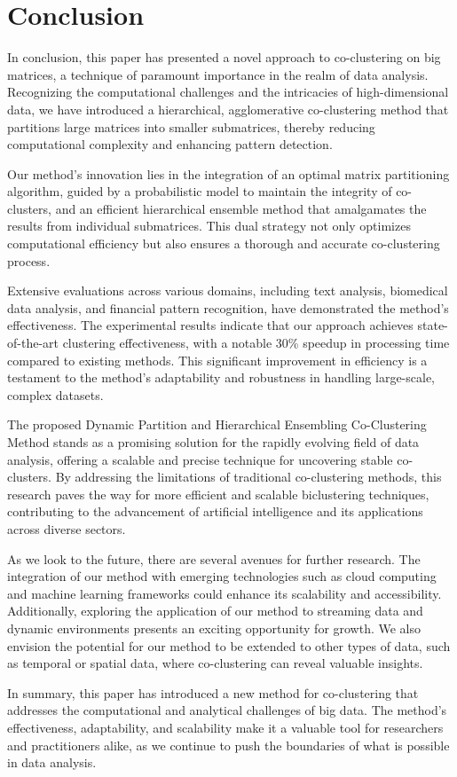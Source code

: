 
\section{Conclusion}
\label{sec:conclude}

In conclusion, this paper has presented a novel approach to co-clustering on big matrices, a technique of paramount importance in the realm of data analysis. Recognizing the computational challenges and the intricacies of high-dimensional data, we have introduced a hierarchical, agglomerative co-clustering method that partitions large matrices into smaller submatrices, thereby reducing computational complexity and enhancing pattern detection.

Our method's innovation lies in the integration of an optimal matrix partitioning algorithm, guided by a probabilistic model to maintain the integrity of co-clusters, and an efficient hierarchical ensemble method that amalgamates the results from individual submatrices. This dual strategy not only optimizes computational efficiency but also ensures a thorough and accurate co-clustering process.

Extensive evaluations across various domains, including text analysis, biomedical data analysis, and financial pattern recognition, have demonstrated the method's effectiveness. The experimental results indicate that our approach achieves state-of-the-art clustering effectiveness, with a notable 30\% speedup in processing time compared to existing methods. This significant improvement in efficiency is a testament to the method's adaptability and robustness in handling large-scale, complex datasets.

The proposed Dynamic Partition and Hierarchical Ensembling Co-Clustering Method stands as a promising solution for the rapidly evolving field of data analysis, offering a scalable and precise technique for uncovering stable co-clusters. By addressing the limitations of traditional co-clustering methods, this research paves the way for more efficient and scalable biclustering techniques, contributing to the advancement of artificial intelligence and its applications across diverse sectors.

As we look to the future, there are several avenues for further research. The integration of our method with emerging technologies such as cloud computing and machine learning frameworks could enhance its scalability and accessibility. Additionally, exploring the application of our method to streaming data and dynamic environments presents an exciting opportunity for growth. We also envision the potential for our method to be extended to other types of data, such as temporal or spatial data, where co-clustering can reveal valuable insights.

In summary, this paper has introduced a new method for co-clustering that addresses the computational and analytical challenges of big data. The method's effectiveness, adaptability, and scalability make it a valuable tool for researchers and practitioners alike, as we continue to push the boundaries of what is possible in data analysis.
